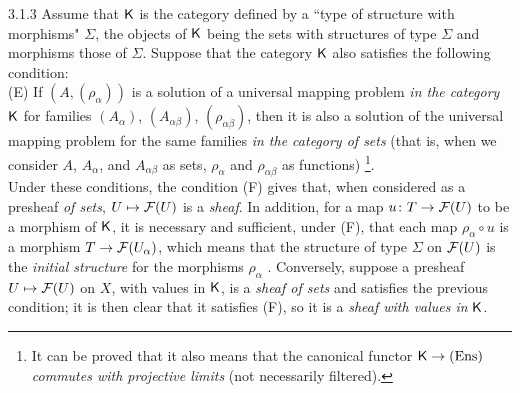 \begin{env}{3.1.3}
\label{env-0.3.1.3}
Assume that $\mathsf{K}$ is the category defined by a ``type of structure
with morphisms" $\Sigma$, the objects of $\mathsf{K}$ being the sets with structures
of type $\Sigma$ and morphisms those of $\Sigma$. Suppose that the category $\mathsf{K}$ also satisfies
the following condition:\\

(E) If $(A,(\rho_\alpha))$ is a solution of a universal mapping problem \emph{in the category} $\mathsf{K}$
for families $(A_\alpha)$, $(A_{\alpha\beta})$, $(\rho_{\alpha\beta})$, then it is also a solution of the
universal mapping problem for the same families \emph{in the category of sets} (that is, when we
consider $A$, $A_\alpha$, and $A_{\alpha\beta}$ as sets, $\rho_\alpha$ and $\rho_{\alpha\beta}$ as functions)
\footnote{It can be proved that it also means that the canonical functor $\mathsf{K}\to(\mathrm{Ens})$
\emph{commutes with projective limits} (not necessarily filtered).}.\\

Under these conditions, the condition (F) gives that, when considered as a presheaf
\emph{of sets}, $U\mapsto\mathcal{F}(U)$ is a \emph{sheaf}. In addition, for a map $u\colon T\to\mathcal{F}(U)$
to be a morphism of $\mathsf{K}$, it is necessary and sufficient, under (F), that each map $\rho_\alpha\circ u$
is a morphism $T\to\mathcal{F}(U_\alpha)$, which means that the structure of type $\Sigma$ on $\mathcal{F}(U)$
is the \emph{initial structure} for the morphisms $\rho_\alpha$ . Conversely, suppose a presheaf
$U\mapsto\mathcal{F}(U)$ on $X$, with values in $\mathsf{K}$, is a \emph{sheaf of sets} and satisfies the previous
condition; it is then clear that it satisfies (F), so it is a \emph{sheaf with values in} $\mathsf{K}$.
\end{env}

